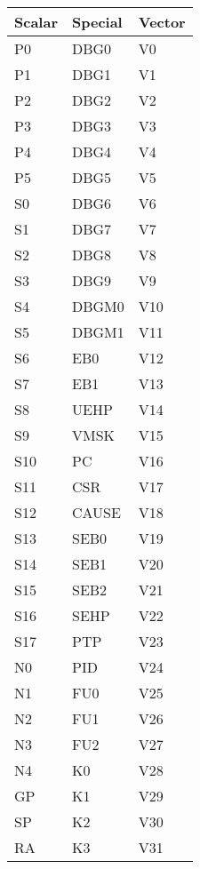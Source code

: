\begin{table}[hbt!]

    \begin{center}

    \begin{tabular}{|l|l|l|}

        \hline
        Scalar & Special & Vector \\
        \hline
        \addlinespace[10pt]
        \hline
        P0 & DBG0 & V0 \\
        \hline
        P1 & DBG1 & V1 \\
        \hline
        P2 & DBG2 & V2 \\
        \hline
        P3 & DBG3 & V3 \\
        \hline
        P4 & DBG4 & V4 \\
        \hline
        P5 & DBG5 & V5 \\
        \hline
        S0 & DBG6 & V6 \\
        \hline
        S1 & DBG7 & V7 \\
        \hline
        S2 & DBG8 & V8 \\
        \hline
        S3 & DBG9 & V9 \\
        \hline
        S4 & DBGM0 & V10 \\
        \hline
        S5 & DBGM1 & V11 \\
        \hline
        S6 & EB0 & V12 \\
        \hline
        S7 & EB1 & V13 \\
        \hline
        S8 & UEHP & V14 \\
        \hline
        S9 & VMSK & V15 \\
        \hline
        S10 & PC & V16 \\
        \hline
        S11 & CSR & V17 \\
        \hline
        S12 & CAUSE & V18 \\
        \hline
        S13 & SEB0 & V19 \\
        \hline
        S14 & SEB1 & V20 \\
        \hline
        S15 & SEB2 & V21 \\
        \hline
        S16 & SEHP & V22 \\
        \hline
        S17 & PTP & V23 \\
        \hline
        N0 & PID & V24 \\
        \hline
        N1 & FU0 & V25 \\
        \hline
        N2 & FU1 & V26 \\
        \hline
        N3 & FU2 & V27 \\
        \hline
        N4 & K0 & V28 \\
        \hline
        GP & K1 & V29 \\
        \hline
        SP & K2 & V30 \\
        \hline
        RA & K3 & V31 \\
        \hline


\end{tabular}
\end{center}
\end{table}

